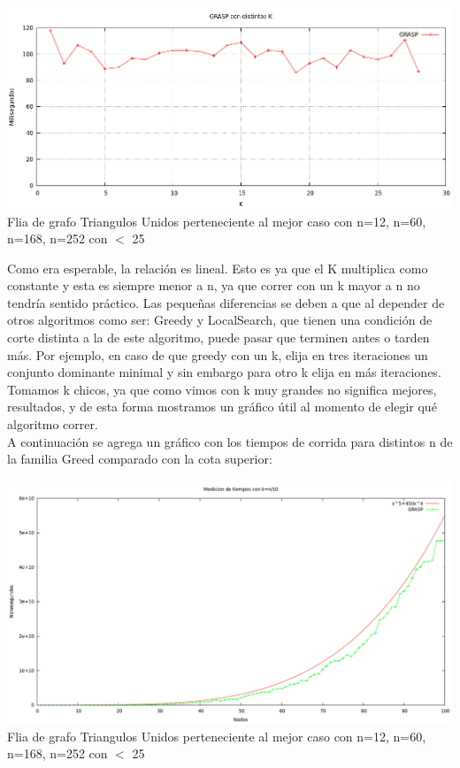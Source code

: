 \begin{center}
\includegraphics[width=17cm]{./graficos/GRASP_distintosK.png}\\
Flia de grafo Triangulos Unidos perteneciente al mejor caso con n=12, n=60, n=168, n=252 con $<$ 25
\end{center}


Como era esperable, la relación es lineal. Esto es ya que el K multiplica como constante y esta es siempre menor a n, ya que correr con un k mayor a n no tendría sentido práctico. Las pequeñas diferencias se deben a que al depender de otros algoritmos como ser: Greedy y LocalSearch, que tienen una condición de corte distinta a la de este algoritmo, puede pasar que terminen antes o tarden más. Por ejemplo, en caso de que greedy con un k, elija en tres iteraciones un conjunto dominante minimal y sin embargo para otro k elija en más iteraciones.\\
Tomamos k chicos, ya que como vimos con k muy grandes no significa mejores, resultados, y de esta forma mostramos un gráfico útil al momento de elegir qué algoritmo correr.\\

A continuación se agrega un gráfico con los tiempos de corrida para distintos n de la familia Greed comparado con la cota superior:

\begin{center}
\includegraphics[width=17cm]{./graficos/grasp/tiempocondistintosngreed.png}\\
Flia de grafo Triangulos Unidos perteneciente al mejor caso con n=12, n=60, n=168, n=252 con $<$ 25
\end{center}

